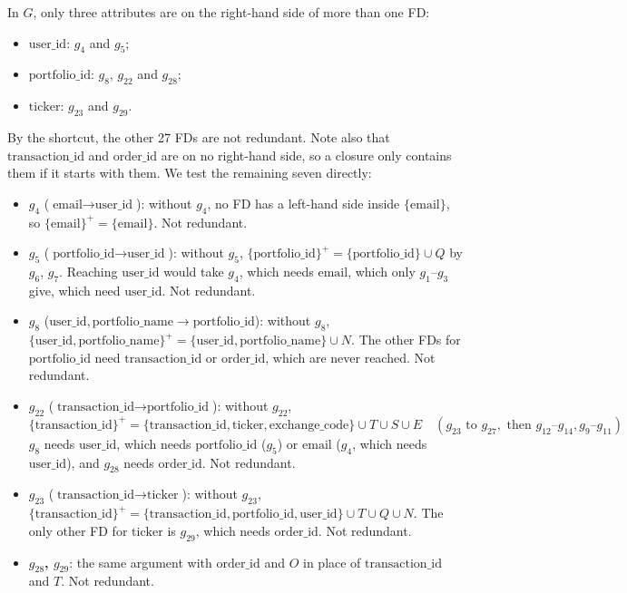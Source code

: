 \documentclass{article}
\newcommand{\at}[1]{\text{#1}}
\newcommand{\cl}[1]{\{#1\}^+}
\newcommand{\gr}[2]{g_{#1}\text{--}g_{#2}}
\begin{document}
In $G$, only three attributes are on the right-hand side of more than one FD:
\begin{itemize}[leftmargin=*, nosep]
  \item $\at{user\_id}$: $g_4$ and $g_5$;
  \item $\at{portfolio\_id}$: $g_8$, $g_{22}$ and $g_{28}$;
  \item $\at{ticker}$: $g_{23}$ and $g_{29}$.
\end{itemize}
By the shortcut, the other 27 FDs are not redundant. Note also that $\at{transaction\_id}$ and $\at{order\_id}$ are on no right-hand side, so a closure only contains them if it starts with them. We test the remaining seven directly:
\begin{itemize}[leftmargin=*]
  \item \textbf{$g_4$} ($\at{email} \rightarrow \at{user\_id}$): without $g_4$, no FD has a left-hand side inside $\{\at{email}\}$, so $\cl{\at{email}} = \{\at{email}\}$. Not redundant.
  \item \textbf{$g_5$} ($\at{portfolio\_id} \rightarrow \at{user\_id}$): without $g_5$, $\cl{\at{portfolio\_id}} = \{\at{portfolio\_id}\} \cup Q$ by $g_6$, $g_7$. Reaching $\at{user\_id}$ would take $g_4$, which needs $\at{email}$, which only $\gr{1}{3}$ give, which need $\at{user\_id}$. Not redundant.
  \item \textbf{$g_8$} ($\at{user\_id}, \at{portfolio\_name} \rightarrow \at{portfolio\_id}$): without $g_8$, $\cl{\at{user\_id}, \at{portfolio\_name}} = \{\at{user\_id}, \at{portfolio\_name}\} \cup N$. The other FDs for $\at{portfolio\_id}$ need $\at{transaction\_id}$ or $\at{order\_id}$, which are never reached. Not redundant.
  \item \textbf{$g_{22}$} ($\at{transaction\_id} \rightarrow \at{portfolio\_id}$): without $g_{22}$,
  \[
    \cl{\at{transaction\_id}} = \{\at{transaction\_id}, \at{ticker}, \at{exchange\_code}\} \cup T \cup S \cup E \quad (g_{23} \text{ to } g_{27}, \text{ then } \gr{12}{14}, \gr{9}{11})
  \]
  $g_8$ needs $\at{user\_id}$, which needs $\at{portfolio\_id}$ ($g_5$) or $\at{email}$ ($g_4$, which needs $\at{user\_id}$), and $g_{28}$ needs $\at{order\_id}$. Not redundant.
  \item \textbf{$g_{23}$} ($\at{transaction\_id} \rightarrow \at{ticker}$): without $g_{23}$, $\cl{\at{transaction\_id}} = \{\at{transaction\_id}, \at{portfolio\_id}, \at{user\_id}\} \cup T \cup Q \cup N$. The only other FD for $\at{ticker}$ is $g_{29}$, which needs $\at{order\_id}$. Not redundant.
  \item \textbf{$g_{28}$, $g_{29}$}: the same argument with $\at{order\_id}$ and $O$ in place of $\at{transaction\_id}$ and $T$. Not redundant.
\end{itemize}
\end{document}
